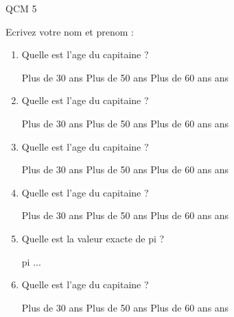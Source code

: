 \documentclass[a4paper, 11pt]{article}
\begin{document}
	QCM 5
	
	Ecrivez votre nom et prenom :
	\begin{qcm}
		\begin{enumerate}
			\item Quelle est l'age du capitaine ?
			\begin{tabenum} [1)]
				\tabenumitem Plus de 30 ans
				\tabenumitem Plus de 50 ans
				\tabenumitem Plus de 60 ans
				 ans
			\end{tabenum}
		\vspace{5mm}

			\item Quelle est l'age du capitaine ?
			\begin{tabenum} [1)]
				\tabenumitem Plus de 30 ans
				\tabenumitem Plus de 50 ans
				\tabenumitem Plus de 60 ans
				 ans
			\end{tabenum}
		\vspace{5mm}

			\item Quelle est l'age du capitaine ?
			\begin{tabenum} [1)]
				\tabenumitem Plus de 30 ans
				\tabenumitem Plus de 50 ans
				\tabenumitem Plus de 60 ans
				 ans
			\end{tabenum}
		\vspace{5mm}

			\item Quelle est l'age du capitaine ?
			\begin{tabenum} [1)]
				\tabenumitem Plus de 30 ans
				\tabenumitem Plus de 50 ans
				\tabenumitem Plus de 60 ans
				 ans
			\end{tabenum}
		\vspace{5mm}

			\item Quelle est la valeur exacte de pi ?
			\begin{tabenum} [1)]
				\tabenumitem pi
				...
			\end{tabenum}
		\vspace{5mm}

			\item Quelle est l'age du capitaine ?
			\begin{tabenum} [1)]
				\tabenumitem Plus de 30 ans
				\tabenumitem Plus de 50 ans
				\tabenumitem Plus de 60 ans
				 ans
			\end{tabenum}
		\vspace{5mm}

		\end{enumerate}
	\end{qcm}
	\newpage
	
\end{document}
